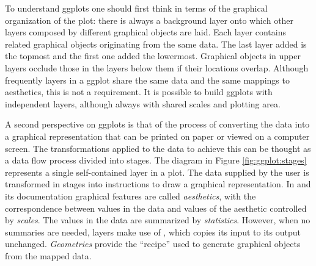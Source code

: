 \documentclass[krantz2]{krantz}\usepackage{knitr}
\begin{document}
To understand ggplots one should first think in terms of the graphical organization of the plot: there is always a background layer onto which other layers composed by different graphical objects are laid. Each layer contains related graphical objects originating from the same data. The last layer added is the topmost and the first one added the lowermost. Graphical objects in upper layers occlude those in the layers below them if their locations overlap. Although frequently layers in a ggplot share the same data and the same mappings to aesthetics, this is not a requirement. It is possible to build ggplots with independent layers, although always with shared scales and plotting area.


A second perspective on ggplots is that of the process of converting the data into a graphical representation that can be printed on paper or viewed on a computer screen. The transformations applied to the data to achieve this can be thought as a data flow process divided into stages. The diagram in Figure \ref{fig:ggplot:stages} represents a single self-contained layer in a plot. The data supplied by the user is transformed in stages into instructions to draw a graphical representation. In  and its documentation graphical features are called \emph{aesthetics}, with the correspondence between values in the data and values of the aesthetic controlled by \emph{scales}. The values in the data are summarized by \emph{statistics}. However, when no summaries are needed, layers make use of , which copies its input to its output unchanged.
\emph{Geometries} provide the ``recipe'' used to generate graphical objects from the mapped data.\vspace{2ex}
\end{document}
